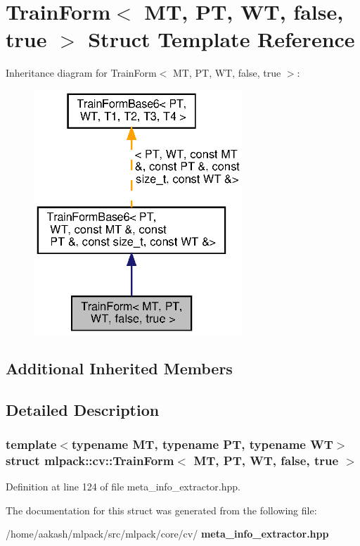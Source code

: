 \section{Train\+Form$<$ MT, PT, WT, false, true $>$ Struct Template Reference}
\label{structmlpack_1_1cv_1_1TrainForm_3_01MT_00_01PT_00_01WT_00_01false_00_01true_01_4}


Inheritance diagram for Train\+Form$<$ MT, PT, WT, false, true $>$\+:
\nopagebreak
\begin{figure}[H]
\begin{center}
\leavevmode
\includegraphics[width=223pt]{structmlpack_1_1cv_1_1TrainForm_3_01MT_00_01PT_00_01WT_00_01false_00_01true_01_4__inherit__graph}
\end{center}
\end{figure}
\subsection*{Additional Inherited Members}


\subsection{Detailed Description}
\subsubsection*{template$<$typename MT, typename PT, typename WT$>$\newline
struct mlpack\+::cv\+::\+Train\+Form$<$ M\+T, P\+T, W\+T, false, true $>$}



Definition at line 124 of file meta\+\_\+info\+\_\+extractor.\+hpp.



The documentation for this struct was generated from the following file\+:\begin{DoxyCompactItemize}
\item 
/home/aakash/mlpack/src/mlpack/core/cv/\textbf{ meta\+\_\+info\+\_\+extractor.\+hpp}\end{DoxyCompactItemize}
